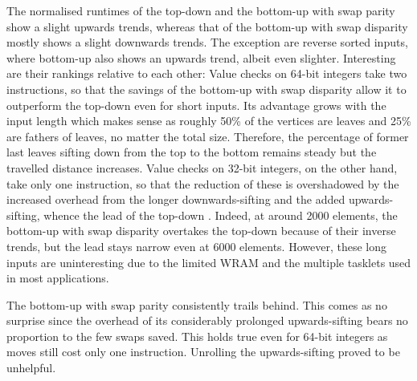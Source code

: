 The normalised runtimes of the top-down \HS{} and the bottom-up \HS{} with swap parity show a slight upwards trends, whereas that of the bottom-up \HS{} with swap disparity mostly shows a slight downwards trends.
The exception are reverse sorted inputs, where bottom-up \HS{} also shows an upwards trend, albeit even slighter.
Interesting are their rankings relative to each other:
Value checks on 64-bit integers take two instructions, so that the savings of the bottom-up \HS{} with swap disparity allow it to outperform the top-down \HS{} even for short inputs.
Its advantage grows with the input length which makes sense as roughly 50\% of the vertices are leaves and 25\% are fathers of leaves, no matter the total size.
Therefore, the percentage of former last leaves sifting down from the top to the bottom remains steady but the travelled distance increases.
Value checks on 32-bit integers, on the other hand, take only one instruction, so that the reduction of these is overshadowed by the increased overhead from the longer downwards-sifting and the added upwards-sifting, whence the lead of the top-down \HS{}.
Indeed, at around 2000 elements, the bottom-up \HS{} with swap disparity overtakes the top-down \HS{} because of their inverse trends, but the lead stays narrow even at 6000 elements.
However, these long inputs are uninteresting due to the limited WRAM and the multiple tasklets used in most applications.

The bottom-up \HS{} with swap parity consistently trails behind.
This comes as no surprise since the overhead of its considerably prolonged upwards-sifting bears no proportion to the few swaps saved.
This holds true even for 64-bit integers as moves still cost only one instruction.
Unrolling the upwards-sifting proved to be unhelpful.
